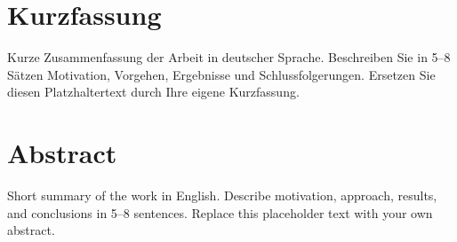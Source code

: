 \section*{Kurzfassung}

Kurze Zusammenfassung der Arbeit in deutscher Sprache. Beschreiben Sie in 5–8
Sätzen Motivation, Vorgehen, Ergebnisse und Schlussfolgerungen. Ersetzen Sie
diesen Platzhaltertext durch Ihre eigene Kurzfassung.

\section*{Abstract}

Short summary of the work in English. Describe motivation, approach, results,
and conclusions in 5–8 sentences. Replace this placeholder text with your own
abstract.
